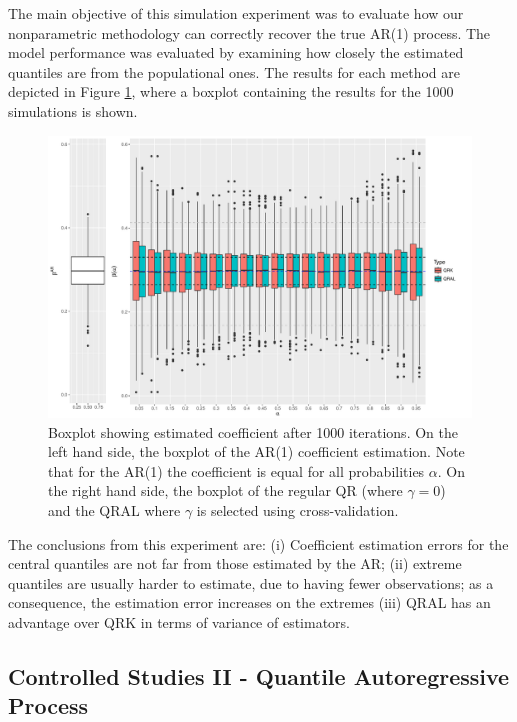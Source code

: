 The main objective of this simulation experiment was to evaluate how our nonparametric methodology can correctly recover the true AR(1) process. The model performance was evaluated by examining how closely the estimated quantiles are from the populational ones. The results for each method are depicted in Figure \ref{fig:boxplot-ar1}, where a boxplot containing the results for the 1000 simulations is shown. %
\begin{figure}[h]
	\centering
	\centerline{\includegraphics[width=7in]{Images/boxplot-ar1.pdf}}
	\caption{Boxplot showing estimated coefficient after 1000 iterations. On the left hand side, the boxplot of the AR(1) coefficient estimation. Note that for the AR(1) the coefficient is equal for all probabilities $\alpha$. On the right hand side, the boxplot of the regular QR (where $\gamma = 0$) and the QRAL where $\gamma$ is selected using cross-validation. }
	\label{fig:boxplot-ar1}
\end{figure}
The conclusions from this experiment are: (i) Coefficient estimation errors for the central quantiles are not far from those estimated by the AR; (ii) extreme quantiles are usually harder to estimate, due to having fewer observations; as a consequence, the estimation error increases on the extremes (iii) QRAL has an advantage over QRK in terms of variance of estimators.


\subsection{Controlled Studies II - Quantile Autoregressive Process} \label{sec:qar-study}

